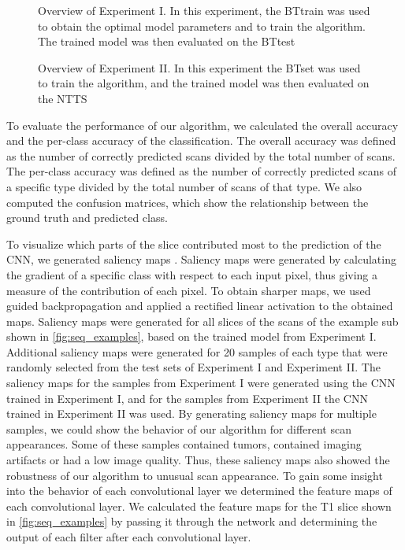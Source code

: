 \begin{figure}
\centering
{}
\caption{Overview of Experiment I. In this experiment, the \gls{BTtrain} was used to obtain the optimal model parameters and to train the algorithm. The trained model was then evaluated on the \gls{BTtest}}
\label{fig:brain_tumor_experiment}
\end{figure}

\begin{figure}
\centering


\caption{Overview of Experiment II. In this experiment the \gls{BTset} was used to train the algorithm, and the trained model was then evaluated on the \gls{NTTS}}
\label{fig:adni_experiment}
\end{figure}

To evaluate the performance of our algorithm, we calculated the overall accuracy and the per-class accuracy of the classification.
The overall accuracy was defined as the number of correctly predicted \glspl{scan} divided by the total number of \glspl{scan}.
The per-class accuracy was defined as the number of correctly predicted \glspl{scan} of a specific \gls{type} divided by the total number of \glspl{scan} of that \gls{type}.
We also computed the confusion matrices, which show the relationship between the ground truth and predicted \gls{class}.

To visualize which parts of the \gls{slice} contributed most to the prediction of the \gls{CNN}, we generated saliency maps \autocite{simonyan2014deep}.
Saliency maps were generated by calculating the gradient of a specific \gls{class} with respect to each input pixel, thus giving a measure of the contribution of each pixel.
To obtain sharper maps, we used guided backpropagation \autocite{springenberg2015striving} and applied a rectified linear activation to the obtained maps.
Saliency maps were generated for all \glspl{slice} of the \glspl{scan} of the example \gls{sub} shown in \cref{fig:seq_examples}, based on the trained model from Experiment I.
Additional saliency maps were generated for 20 \glspl{sample} of each \gls{type} that were randomly selected from the test sets of Experiment I and Experiment II.
The saliency maps for the \glspl{sample} from Experiment I were generated using the \gls{CNN} trained in Experiment I, and for the \glspl{sample} from Experiment II the \gls{CNN} trained in Experiment II was used.
By generating saliency maps for multiple \glspl{sample}, we could show the behavior of our algorithm for different \gls{scan} appearances.
Some of these \glspl{sample} contained \glspl{tumor}, contained imaging artifacts or had a low image quality.
Thus, these saliency maps also showed the robustness of our algorithm to unusual \gls{scan} appearance.
To gain some insight into the behavior of each convolutional layer we determined the feature maps of each convolutional layer.
We calculated the feature maps for the \gls{T1} \gls{slice} shown in \cref{fig:seq_examples} by passing it through the network and determining the output of each filter after each convolutional layer.


